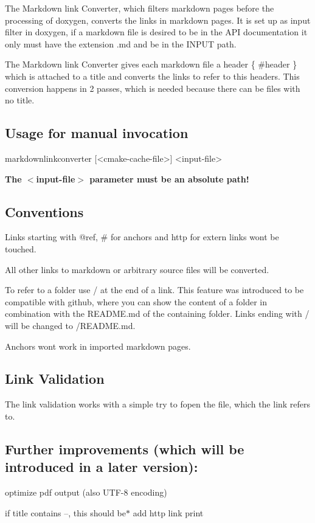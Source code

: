 The Markdown link Converter, which filters markdown pages before the processing of doxygen, converts the links in markdown pages. It is set up as input filter in doxygen, if a markdown file is desired to be in the A\+P\+I documentation it only must have the extension {\ttfamily .md} and be in the {\ttfamily I\+N\+P\+U\+T} path.

The Markdown link Converter gives each markdown file a header {\ttfamily \{ \#header \}} which is attached to a title and converts the links to refer to this headers. This conversion happens in 2 passes, which is needed because there can be files with no title.

\subsection*{Usage for manual invocation}

\begin{DoxyVerb}    markdownlinkconverter [<cmake-cache-file>] <input-file>
\end{DoxyVerb}


{\bfseries The $<$input-\/file$>$ parameter must be an absolute path!}

\subsection*{Conventions}


\begin{DoxyItemize}
\item Links starting with {\ttfamily @ref}, {\ttfamily \#} for anchors and {\ttfamily http} for extern links wont be touched.
\item All other links to markdown or arbitrary source files will be converted.
\item To refer to a folder use {\ttfamily /} at the end of a link. This feature was introduced to be compatible with github, where you can show the content of a folder in combination with the R\+E\+A\+D\+M\+E.\+md of the containing folder. Links ending with {\ttfamily /} will be changed to {\ttfamily /\+R\+E\+A\+D\+M\+E.md}.
\item Anchors wont work in imported markdown pages.
\end{DoxyItemize}

\subsection*{Link Validation}

The link validation works with a simple try to {\ttfamily fopen} the file, which the link refers to.

\subsection*{Further improvements (which will be introduced in a later version)\+:}


\begin{DoxyItemize}
\item optimize pdf output (also U\+T\+F-\/8 encoding)
\item if title contains --, this should be$\ast$ add http link print 
\end{DoxyItemize}